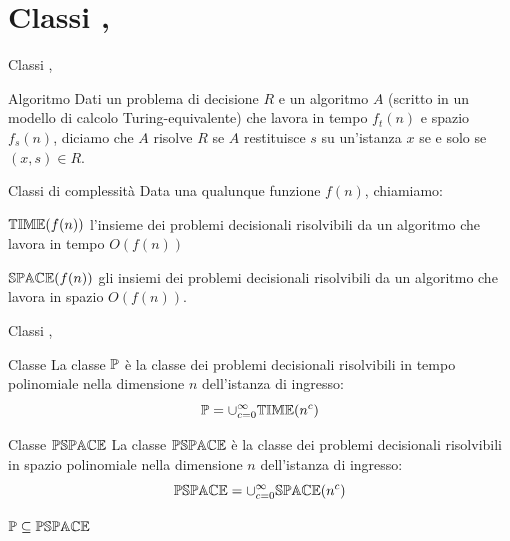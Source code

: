 \section{Classi \PTIME, \PSPACE}

\begin{frame}{Classi \PTIME, \PSPACE}

\vspace{-9pt}
\begin{block}{Algoritmo}
Dati un problema di decisione $R$ e un algoritmo $A$ (scritto in un modello di calcolo Turing-equivalente)
che lavora in tempo $f_t(n)$ e spazio $f_s(n)$, diciamo che $A$ 
risolve $R$ se $A$ restituisce $s$ su un'istanza $x$ 
se e solo se $(x,s) \in R$.
\end{block}

\bigskip
\begin{block}{Classi di complessità}
Data una qualunque funzione $f(n)$, chiamiamo:
\BIL
\item \alert{$\mbox{$\mathbb{TIME}$}(f(n))$} l'insieme dei problemi decisionali
 risolvibili da un algoritmo che lavora in tempo $O(f(n))$
\item \alert{$\mbox{$\mathbb{SPACE}$}(f(n))$} gli insiemi dei problemi 
decisionali risolvibili da un algoritmo che lavora  in spazio $O(f(n))$.
\EIL
\end{block}
%

\end{frame}

\begin{frame}{Classi \PTIME, \PSPACE}

\vspace{-9pt}
\begin{block}{Classe \PTIME}
La \alert{classe $\mbox{\sc $\mathbb{P}$}$} è la classe dei problemi decisionali risolvibili
in tempo polinomiale nella dimensione $n$ dell'istanza di ingresso:
\[
  \mbox{\sc $\mathbb{P}$} = \cup_{c=0}^{\infty} \mbox{$\mathbb{TIME}$}(n^c)
\]
\end{block}

\begin{block}{Classe $\mbox{$\mathbb{PSPACE}$}$}
La \alert{classe $\mbox{$\mathbb{PSPACE}$}$} è la classe dei problemi decisionali risolvibili
in spazio polinomiale nella dimensione $n$ dell'istanza di ingresso:
\[
  \mbox{$\mathbb{PSPACE}$} = \cup_{c=0}^{\infty} \mbox{$\mathbb{SPACE}$}(n^c)
\]
\end{block}

\medskip
{}
\BI
\item $\mbox{\sc $\mathbb{P}$} \subseteq \mbox{$\mathbb{PSPACE}$}$
\EI

\end{frame}

